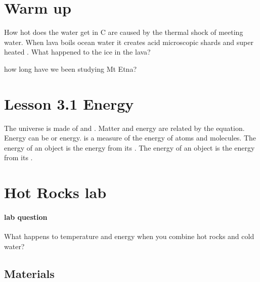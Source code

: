 \documentclass[12pt]{exam}
\begin{document}
\section*{Warm up}

\begin{questions}
    \question How hot does the water get in \textdegree C \fillin[165]
    \question \fillin[explosions] are caused by the thermal shock of \fillin[lava] meeting water.
    \question When lava boils ocean water it creates \fillin[hydrochloric] acid microscopic \fillin[volcanic] shards and super heated \fillin[steam].
    \question What happened to the ice in the lava?
    
    \vspace{2cm}
    
    \question how long have we been studying Mt Etna? \fillin[3500 years]
\end{questions}

\newpage

\section*{Lesson 3.1 Energy}

\begin{questions}
    \question The universe is made of \fillin[matter] and \fillin[energy].
    \question Matter and energy are related by the \fillin[$E=mc^2$] equation.
    \question Energy can be \fillin[potential] or \fillin[kinetic] energy.
    \question \fillin[Temperature] is a measure of the \fillin[kinetic] energy of atoms and molecules.
    \question The \fillin[kinetic] energy of an object is the energy from its \fillin[movement].
    \question The \fillin[Potential] energy of an object is the energy from its \fillin[position].





\end{questions}

\section*{Hot Rocks lab}

\paragraph{lab question} What happens to temperature and energy when you combine hot rocks and cold water?

\subsection*{Materials}
\end{document}
